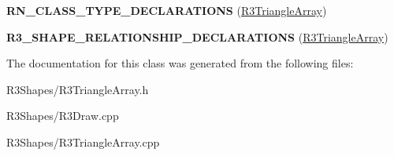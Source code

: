 \begin{DoxyCompactItemize}
\item 
{\bfseries R\+N\+\_\+\+C\+L\+A\+S\+S\+\_\+\+T\+Y\+P\+E\+\_\+\+D\+E\+C\+L\+A\+R\+A\+T\+I\+O\+NS} (\hyperlink{class_r3_triangle_array}{R3\+Triangle\+Array})\hypertarget{class_r3_triangle_array_a25b9f9024f1fef28ce7f8fdd40f783e0}{}\label{class_r3_triangle_array_a25b9f9024f1fef28ce7f8fdd40f783e0}

\item 
{\bfseries R3\+\_\+\+S\+H\+A\+P\+E\+\_\+\+R\+E\+L\+A\+T\+I\+O\+N\+S\+H\+I\+P\+\_\+\+D\+E\+C\+L\+A\+R\+A\+T\+I\+O\+NS} (\hyperlink{class_r3_triangle_array}{R3\+Triangle\+Array})\hypertarget{class_r3_triangle_array_ac666cd2fde26c787b79d731399c55a55}{}\label{class_r3_triangle_array_ac666cd2fde26c787b79d731399c55a55}

\end{DoxyCompactItemize}


The documentation for this class was generated from the following files\+:\begin{DoxyCompactItemize}
\item 
R3\+Shapes/R3\+Triangle\+Array.\+h\item 
R3\+Shapes/R3\+Draw.\+cpp\item 
R3\+Shapes/R3\+Triangle\+Array.\+cpp\end{DoxyCompactItemize}

